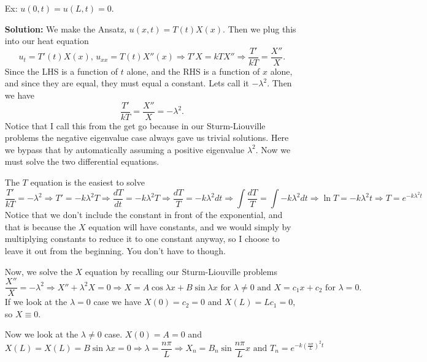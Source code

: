 \documentclass[reqno]{amsart}
\theoremstyle{definition}
\begin{document}
\begin{itemize}

\item[Ex:  ]  $u(0,t) = u(L,t) = 0$.

\textbf{Solution:  }  We make the Ansatz, $u(x,t) = T(t)X(x)$.  Then we plug this
into our heat equation
%
\begin{equation*}
u_t = T'(t)X(x),\, u_{xx} = T(t)X''(x) \Rightarrow T'X = kTX''
\Rightarrow \frac{T'}{kT} = \frac{X''}{X}.
\end{equation*}
%
Since the LHS is a function of $t$ alone, and the RHS is a function of $x$ alone,
and since they are equal, they must equal a constant.  Lets call it $-\lambda^2$.
Then we have
%
\begin{equation}
\frac{T'}{kT} = \frac{X''}{X} = -\lambda^2.
\end{equation}
%
Notice that I call this from the get go because in our Sturm-Liouville problems
the negative eigenvalue case always gave us trivial solutions.  Here we bypass
that by automatically assuming a positive eigenvalue $\lambda^2$.  Now we must
solve the two differential equations.

The $T$ equation is the easiest to solve
%
\begin{equation*}
\frac{T'}{kT} = -\lambda^2 \Rightarrow T' = -k\lambda^2 T
\Rightarrow \frac{dT}{dt} =  -k\lambda^2 T \Rightarrow
\frac{dT}{T} = -k\lambda^2 dt \Rightarrow \int \frac{dT}{T} = \int -k\lambda^2 dt
\Rightarrow \ln T = -k\lambda^2 t \Rightarrow T = e^{-k\lambda^2 t}
\end{equation*}
%
Notice that we don't include the constant in front of the exponential, and that
is because the $X$ equation will have constants, and we would simply by multiplying
constants to reduce it to one constant anyway, so I choose to leave it out from the
beginning.  You don't have to though.

Now, we solve the $X$ equation by recalling our Sturm-Liouville problems
%
\begin{equation*}
\frac{X''}{X} = -\lambda^2 \Rightarrow X'' + \lambda^2 X = 0
\Rightarrow X = A\cos\lambda x + B\sin\lambda x \text{  for $\lambda \neq 0$ and  }
X = c_1x + c_2 \text{  for $\lambda = 0$.}
\end{equation*}
%
If we look at the $\lambda = 0$ case we have $X(0) = c_2 = 0$
and $X(L) = Lc_1 = 0$, so $X \equiv 0$.

Now we look at the $\lambda \neq 0$ case.  $X(0) = A = 0$ and
%
\begin{equation*}
X(L) = X(L) = B\sin\lambda x = 0 \Rightarrow \lambda = \frac{n\pi}{L}
\Rightarrow X_n = B_n\sin\frac{n\pi}{L}x \text{  and  }
T_n = e^{-k\left(\frac{n\pi}{L}\right)^2 t}
\end{equation*}


\end{itemize}
\end{document}
